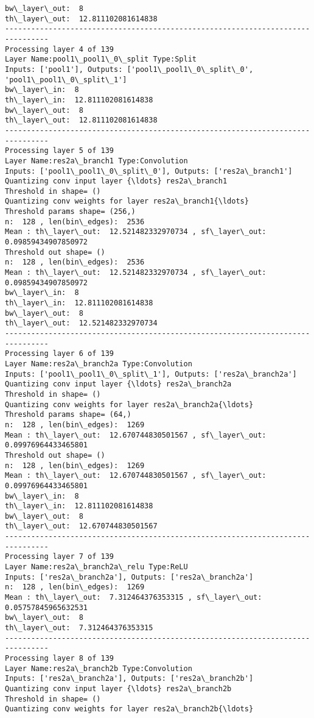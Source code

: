 \documentclass[11pt]{article}
\begin{document}
\begin{Verbatim}[commandchars=\\\{\}]
bw\_layer\_out:  8
th\_layer\_out:  12.811102081614838
--------------------------------------------------------------------------------
Processing layer 4 of 139
Layer Name:pool1\_pool1\_0\_split Type:Split
Inputs: ['pool1'], Outputs: ['pool1\_pool1\_0\_split\_0', 'pool1\_pool1\_0\_split\_1']
bw\_layer\_in:  8
th\_layer\_in:  12.811102081614838
bw\_layer\_out:  8
th\_layer\_out:  12.811102081614838
--------------------------------------------------------------------------------
Processing layer 5 of 139
Layer Name:res2a\_branch1 Type:Convolution
Inputs: ['pool1\_pool1\_0\_split\_0'], Outputs: ['res2a\_branch1']
Quantizing conv input layer {\ldots} res2a\_branch1
Threshold in shape= ()
Quantizing conv weights for layer res2a\_branch1{\ldots}
Threshold params shape= (256,)
n:  128 , len(bin\_edges):  2536
Mean : th\_layer\_out:  12.521482332970734 , sf\_layer\_out:  0.09859434907850972
Threshold out shape= ()
n:  128 , len(bin\_edges):  2536
Mean : th\_layer\_out:  12.521482332970734 , sf\_layer\_out:  0.09859434907850972
bw\_layer\_in:  8
th\_layer\_in:  12.811102081614838
bw\_layer\_out:  8
th\_layer\_out:  12.521482332970734
--------------------------------------------------------------------------------
Processing layer 6 of 139
Layer Name:res2a\_branch2a Type:Convolution
Inputs: ['pool1\_pool1\_0\_split\_1'], Outputs: ['res2a\_branch2a']
Quantizing conv input layer {\ldots} res2a\_branch2a
Threshold in shape= ()
Quantizing conv weights for layer res2a\_branch2a{\ldots}
Threshold params shape= (64,)
n:  128 , len(bin\_edges):  1269
Mean : th\_layer\_out:  12.670744830501567 , sf\_layer\_out:  0.09976964433465801
Threshold out shape= ()
n:  128 , len(bin\_edges):  1269
Mean : th\_layer\_out:  12.670744830501567 , sf\_layer\_out:  0.09976964433465801
bw\_layer\_in:  8
th\_layer\_in:  12.811102081614838
bw\_layer\_out:  8
th\_layer\_out:  12.670744830501567
--------------------------------------------------------------------------------
Processing layer 7 of 139
Layer Name:res2a\_branch2a\_relu Type:ReLU
Inputs: ['res2a\_branch2a'], Outputs: ['res2a\_branch2a']
n:  128 , len(bin\_edges):  1269
Mean : th\_layer\_out:  7.312464376353315 , sf\_layer\_out:  0.05757845965632531
bw\_layer\_out:  8
th\_layer\_out:  7.312464376353315
--------------------------------------------------------------------------------
Processing layer 8 of 139
Layer Name:res2a\_branch2b Type:Convolution
Inputs: ['res2a\_branch2a'], Outputs: ['res2a\_branch2b']
Quantizing conv input layer {\ldots} res2a\_branch2b
Threshold in shape= ()
Quantizing conv weights for layer res2a\_branch2b{\ldots}

\end{Verbatim}
\end{document}
